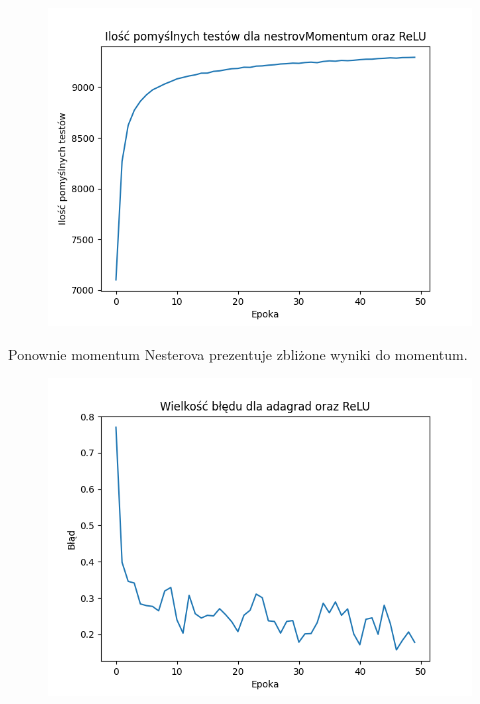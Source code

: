 \documentclass{article}
\begin{document}
\begin{figure}[!htb]
  \centering
  \includegraphics[width=\linewidth]{test_nestrovMomentum_ReLU.png}
\end{figure}

Ponownie momentum Nesterova prezentuje zbliżone wyniki do momentum.

\begin{figure}[!htb]
  \centering
  \includegraphics[width=\linewidth]{error_adagrad_ReLU.png}
\end{figure}
\end{document}
